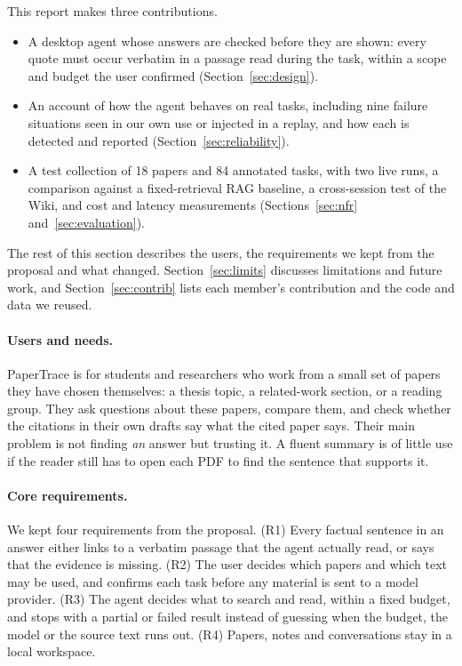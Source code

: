\documentclass{article}
\begin{document}
\begin{samepage}
This report makes three contributions.
\begin{itemize}
  \item A desktop agent whose answers are checked before they are shown: every quote must occur
  verbatim in a passage read during the task, within a scope and budget the user confirmed
  (Section~\ref{sec:design}).
  \item An account of how the agent behaves on real tasks, including nine failure situations seen in
  our own use or injected in a replay, and how each is detected and reported (Section~\ref{sec:reliability}).
  \item A test collection of 18 papers and 84 annotated tasks, with two live runs, a comparison against
  a fixed-retrieval RAG baseline, a cross-session test of the Wiki, and cost and latency measurements
  (Sections~\ref{sec:nfr} and~\ref{sec:evaluation}).
\end{itemize}
\end{samepage}
The rest of this section describes the users, the requirements we kept from the proposal and what
changed. Section~\ref{sec:limits} discusses limitations and future work, and
Section~\ref{sec:contrib} lists each member's contribution and the code and data we reused.

\paragraph{Users and needs.}
PaperTrace is for students and researchers who work from a small set of papers they have chosen
themselves: a thesis topic, a related-work section, or a reading group. They ask questions about these
papers, compare them, and check whether the citations in their own drafts say what the cited paper says.
Their main problem is not finding \emph{an} answer but trusting it. A fluent summary is of little use if
the reader still has to open each PDF to find the sentence that supports it.

\paragraph{Core requirements.}
We kept four requirements from the proposal.
(R1) Every factual sentence in an answer either links to a verbatim passage that the agent actually
read, or says that the evidence is missing.
(R2) The user decides which papers and which text may be used, and confirms each task before any
material is sent to a model provider.
(R3) The agent decides what to search and read, within a fixed budget, and stops with a partial or
failed result instead of guessing when the budget, the model or the source text runs out.
(R4) Papers, notes and conversations stay in a local workspace.
\end{document}
